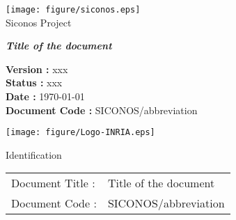 


%

\thispagestyle{empty}

\begin{center}
\texttt{[image: figure/siconos.eps]}\\
\textsf{Siconos Project}\\[6cm]
\end{center}

\begin{center}
\huge
\textsf{\textbf{\textit{Title of the document}}}\\[2.5cm]
\end{center}

\large
\begin{center}
\textsf{\textbf{Version :} xxx}\\
\textsf{\textbf{Status :}  xxx}\\
\textsf{\textbf{Date : }\today}\\
\textsf{\textbf{Document Code :} SICONOS/abbreviation}\\[5cm]

\end{center}

\normalsize

\begin{flushright}
\texttt{[image: figure/Logo-INRIA.eps]}
\end{flushright}

\clearpage






\normalsize

\begin{center}
  \textsf{\Large Identification}
\end{center}

\noindent\begin{tabular}{|p{}|p{}|}
\hline
Document Title : & \textsf{Title of the document} \\
Document Code :  & \textsf{SICONOS/abbreviation} \\
\hline
\end{tabular}
\textsf{ }\\


